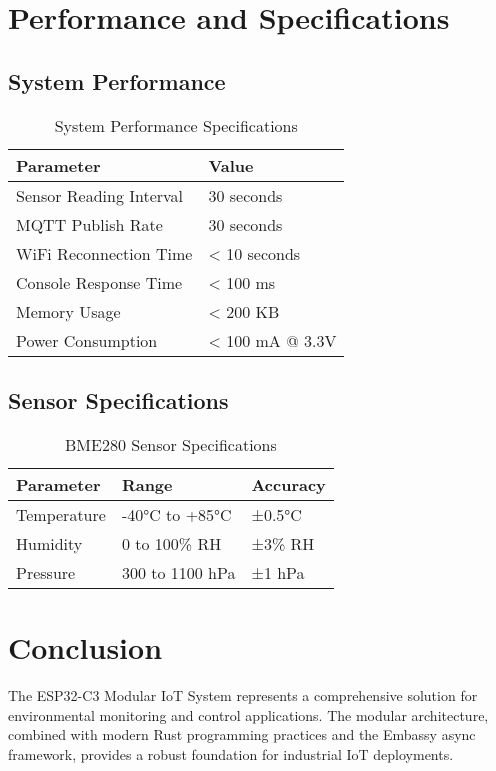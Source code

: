 \documentclass[12pt,a4paper]{article}
\begin{document}
\section{Performance and Specifications}

\subsection{System Performance}

\begin{table}[h!]
\centering
\begin{tabular}{@{}ll@{}}
\toprule
\textbf{Parameter} & \textbf{Value} \\
\midrule
Sensor Reading Interval & 30 seconds \\
MQTT Publish Rate & 30 seconds \\
WiFi Reconnection Time & < 10 seconds \\
Console Response Time & < 100 ms \\
Memory Usage & < 200 KB \\
Power Consumption & < 100 mA @ 3.3V \\
\bottomrule
\end{tabular}
\caption{System Performance Specifications}
\label{tab:performance}
\end{table}

\subsection{Sensor Specifications}

\begin{table}[h!]
\centering
\begin{tabular}{@{}lll@{}}
\toprule
\textbf{Parameter} & \textbf{Range} & \textbf{Accuracy} \\
\midrule
Temperature & -40°C to +85°C & ±0.5°C \\
Humidity & 0 to 100\% RH & ±3\% RH \\
Pressure & 300 to 1100 hPa & ±1 hPa \\
\bottomrule
\end{tabular}
\caption{BME280 Sensor Specifications}
\label{tab:sensor_specs}
\end{table}

\section{Conclusion}

The ESP32-C3 Modular IoT System represents a comprehensive solution for environmental monitoring and control applications. The modular architecture, combined with modern Rust programming practices and the Embassy async framework, provides a robust foundation for industrial IoT deployments.
\end{document}
